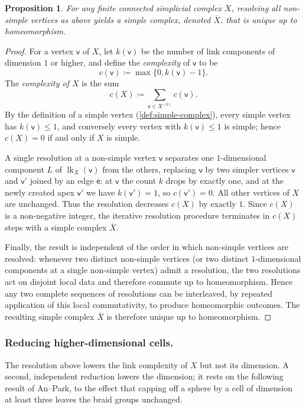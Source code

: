 \documentclass[reqno]{amsart}
\newtheorem{proposition}[theorem]{Proposition}
\theoremstyle{definition}
\newcommand\sfe{\mathsf{e}}
\newcommand\sfv{\mathsf{v}}
\renewcommand{\bar}{\overline}
\DeclareMathOperator{\lk}{lk}
\numberwithin{equation}{section}
\begin{document}
\begin{proposition}\label{prop:simple-model-unique}
For any finite connected simplicial complex \(X\), resolving all
non-simple vertices as above yields a simple complex, denoted
\(\bar X\), that is unique up to homeomorphism.
\end{proposition}

\begin{proof}
For a vertex \(\sfv\) of \(X\), let \(k(\sfv)\) be the number of link components of dimension \(1\) or higher,
and define the \emph{complexity} of \(\sfv\) to be
\[
c(\sfv) \coloneqq \max\bigl\{0, k(\sfv) - 1\bigr\}.
\]
The \emph{complexity of \(X\)} is the sum
\[
c(X) \coloneqq \sum_{\sfv \in X^{(0)}} c(\sfv).
\]
By the definition of a simple vertex
(\cref{def:simple-complex}), every simple vertex has
\(k(\sfv)\le 1\), and conversely every vertex with \(k(\sfv) \leq 1\) is
simple; hence \(c(X) = 0\) if and only if \(X\) is simple.

A single resolution at a non-simple vertex \(\sfv\) separates one
\(1\)-dimensional component \(L\) of \(\lk_X(\sfv)\) from the
others, replacing \(\sfv\) by two simpler vertices \(\sfv\) and \(\sfv'\)
joined by an edge \(\sfe\): at \(\sfv\) the count \(k\) drops by exactly
one, and at the newly created apex \(\sfv'\) we have \(k(\sfv') = 1\), so
\(c(\sfv') = 0\). All other vertices of \(X\) are unchanged. Thus the
resolution decreases \(c(X)\) by exactly \(1\). Since \(c(X)\) is a
non-negative integer, the iterative resolution procedure
terminates in \(c(X)\) steps with a simple complex \(\bar X\).

Finally, the result is independent of the order in which
non-simple vertices are resolved: whenever two distinct
non-simple vertices (or two distinct \(1\)-dimensional components
at a single non-simple vertex) admit a resolution, the two
resolutions act on disjoint local data and therefore commute up
to homeomorphism. Hence any two complete sequences of
resolutions can be interleaved, by repeated application of this
local commutativity, to produce homeomorphic outcomes. The
resulting simple complex \(\bar X\) is therefore unique up to
homeomorphism.
\end{proof}

\subsubsection{Reducing higher-dimensional cells.}
The resolution above lowers the link complexity of \(X\) but not
its dimension. A second, independent reduction lowers the
dimension; it rests on the following result of An--Park, to the
effect that capping off a sphere by a cell of dimension at least
three leaves the braid groups unchanged.
\end{document}
